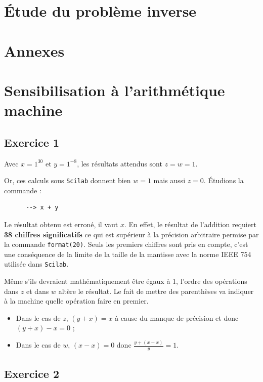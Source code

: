 \documentclass[a4paper,11pt]{article}
\theoremstyle{nonumberplain}
\theoremstyle{nonumberplain}
\begin{document}
\section{\'{E}tude du problème inverse}

\section*{Annexes}

\vspace{8cm}

\section{Sensibilisation à l'arithmétique machine}
\subsection*{Exercice 1}

    Avec $x = 1^{30}$ et $y = 1^{-8}$, les résultats attendus sont $z = w = 1$.

    Or, ces calculs sous \texttt{Scilab} donnent bien $w = 1$ mais aussi $z = 0$. \'{E}tudions la commande :
    \begin{verbatim}
      --> x + y
    \end{verbatim}
    Le résultat obtenu est erroné, il vaut $x$. En effet, le résultat de l'addition requiert \textbf{38 chiffres significatifs} ce qui est supérieur à la précision arbitraire permise par la commande \texttt{format(20)}.
    Seuls les premiers chiffres sont pris en compte, c'est une conséquence de la limite de la taille de la mantisse avec la norme IEEE 754 utilisée dans \texttt{Scilab}.
    \newline

    Même s'ils devraient mathématiquement être égaux à 1, l'ordre des opérations dans $z$ et dans $w$ altère le résultat.
    Le fait de mettre des parenthèses va indiquer à la machine quelle opération faire en premier.
    \begin{itemize}
        \item Dans le cas de $z$, $(y + x) = x$ à cause du manque de précision et donc $(y + x) - x = 0$ ;
        \item Dans le cas de $w$, $(x - x) = 0$ donc $\frac{y + (x -x)}{y} = 1$.
    \end{itemize}


\subsection*{Exercice 2}
\end{document}
